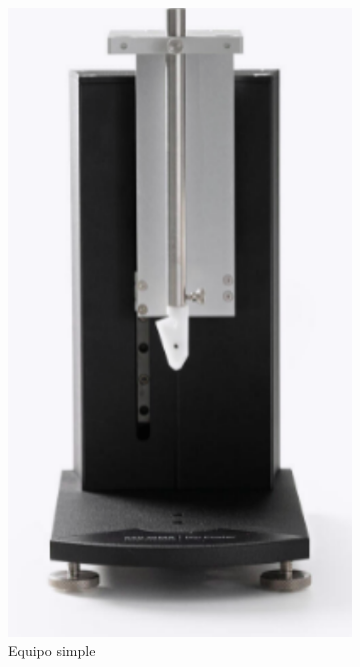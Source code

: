 \begin{figure}[!htpb]
     \centering
     \begin{subfigure}[b]{0.4\textwidth}
         \centering
         \includegraphics[width=.65\textwidth]{./Figures/dip_biolin.pdf}
         \caption{Equipo simple}
         \label{fig:dip_biolin}
     \end{subfigure}
     \hfill
     \begin{subfigure}[b]{0.4\textwidth}
         \centering

\end{subfigure}
\end{figure}
